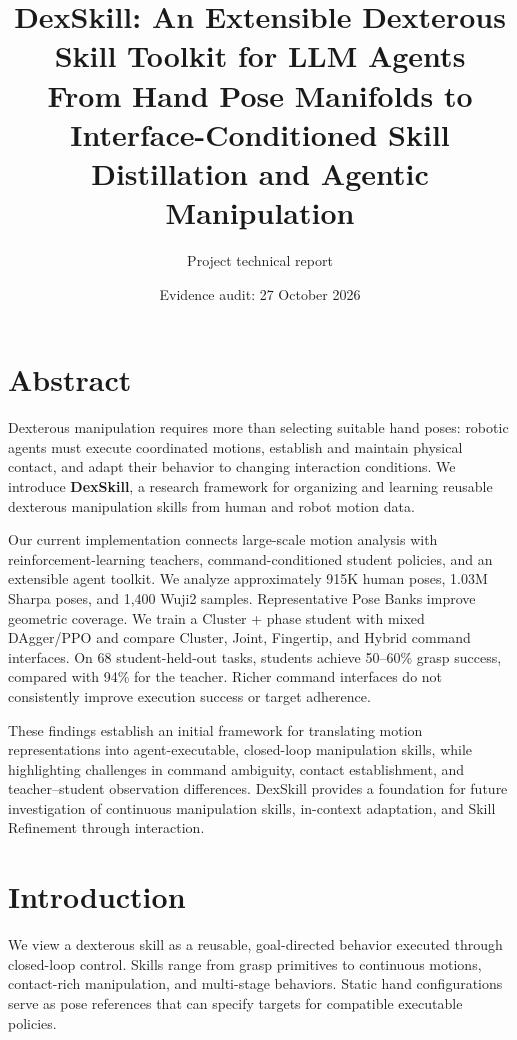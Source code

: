 \documentclass[10pt,twocolumn]{article}
\title{DexSkill: An Extensible Dexterous Skill Toolkit for LLM Agents\\[5pt]\large From Hand Pose Manifolds to Interface-Conditioned Skill Distillation and Agentic Manipulation}
\author{Project technical report}
\date{Evidence audit: 27 October 2026}
\begin{document}
\maketitle




\section*{Abstract}

Dexterous manipulation requires more than selecting suitable hand poses: robotic agents must execute coordinated motions, establish and maintain physical contact, and adapt their behavior to changing interaction conditions. We introduce \textbf{DexSkill}, a research framework for organizing and learning reusable dexterous manipulation skills from human and robot motion data.

Our current implementation connects large-scale motion analysis with reinforcement-learning teachers, command-conditioned student policies, and an extensible agent toolkit. We analyze approximately 915K human poses, 1.03M Sharpa poses, and 1,400 Wuji2 samples. Representative Pose Banks improve geometric coverage. We train a Cluster + phase student with mixed DAgger/PPO and compare Cluster, Joint, Fingertip, and Hybrid command interfaces. On 68 student-held-out tasks, students achieve 50--60\% grasp success, compared with 94\% for the teacher. Richer command interfaces do not consistently improve execution success or target adherence.

These findings establish an initial framework for translating motion representations into agent-executable, closed-loop manipulation skills, while highlighting challenges in command ambiguity, contact establishment, and teacher--student observation differences. DexSkill provides a foundation for future investigation of continuous manipulation skills, in-context adaptation, and Skill Refinement through interaction.

\section{Introduction}

We view a dexterous skill as a reusable, goal-directed behavior executed through closed-loop control. Skills range from grasp primitives to continuous motions, contact-rich manipulation, and multi-stage behaviors. Static hand configurations serve as pose references that can specify targets for compatible executable policies.
\end{document}
